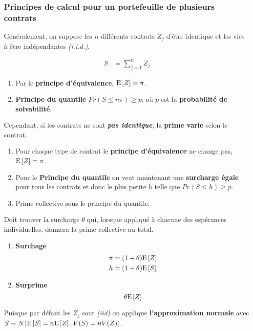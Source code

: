 \documentclass[10pt, french]{article}
\begin{document}
\begin{multicols*}{3}
\subsubsection*{Principes de calcul pour un portefeuille de plusieurs contrats}

Généralement, on suppose les $n$ différents contrats $Z_{j}$ d'être identique et les vies à être indépendantes \textit{(i.i.d.)}.

\begin{align*}	
	S &= \sum_{j = 1}^{n} Z_j 
\end{align*}

\begin{enumerate}
	\item[1. ] Par le \textbf{principe d'équivalence}, $\mathrm{E} \left[ Z \right] = \pi$.
	\item[3. ] \textbf{Principe du quantile }$Pr(S \le n \pi) \ge p$, où $p$ est la \textbf{probabilité de solvabilité}.
\end{enumerate}

Cependant, si les contrats ne sont \textbf{\textit{pas identique}}, la \textbf{prime varie }selon le contrat.
\begin{enumerate}
	\item[1. ] Pour chaque type de contrat le \textbf{principe d'équivalence} ne change pas, $\mathrm{E} \left[ Z \right] = \pi$.
	\item[3. ] Pour le \textbf{Principe du quantile }on veut maintenant une \textbf{surcharge égale} pour tous les contrats et donc le plus petite h telle que $Pr(S \le h) \ge p$.
	\item[$h$ : ] Prime collective sous le principe du quantile.
\end{enumerate}

Doit trouver la surcharge $\theta$ qui, lorsque appliqué à chacune des espérances individuelles, donnera la prime collective au total.

\begin{enumerate}
	\item[$\theta$ : ] \textbf{Surchage}
\begin{align*}
		\pi &= (1 + \theta) \mathrm{E} \left[ Z \right] \\
		h &= (1 + \theta) \mathrm{E} \left[ S \right] 
\end{align*}
	\item[] \textbf{Surprime}
	\[
		\theta \mathrm{E} \left[ Z \right]
	\]
\end{enumerate}

Puisque par défaut les $Z_{j}$ sont \textit{(iid)} on applique \textbf{l'approximation normale} avec $S \sim N(\mathrm{E} \left[ S \right] = n \mathrm{E} \left[ Z \right], V(S) = nV(Z))$.


\end{multicols*}
\end{document}
